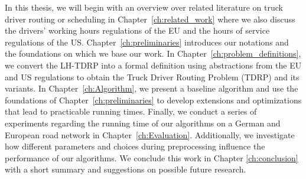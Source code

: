 In this thesis, we will begin with an overview over related literature on truck driver routing or scheduling in Chapter~\ref{ch:related_work} where we also discuss the drivers' working hours regulations of the EU and the hours of service regulations of the US. Chapter~\ref{ch:preliminaries} introduces our notations and the foundations on which we base our work. In Chapter~\ref{ch:problem_definitions}, we convert the LH-TDRP into a formal definition using abstractions from the EU and US regulations to obtain the Truck Driver Routing Problem (TDRP) and its variants. In Chapter~\ref{ch:Algorithm}, we present a baseline algorithm and use the foundations of Chapter~\ref{ch:preliminaries} to develop extensions and optimizations that lead to practicable running times. Finally, we conduct a series of experiments regarding the running time of our algorithms on a German and European road network in Chapter~\ref{ch:Evaluation}. Additionally, we investigate how different parameters and choices during preprocessing influence the performance of our algorithms. We conclude this work in Chapter \ref{ch:conclusion} with a short summary and suggestions on possible future research.